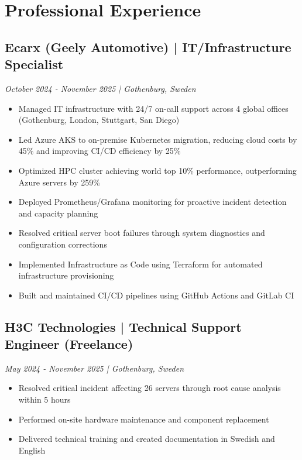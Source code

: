 \documentclass[11pt,a4paper]{article}
\begin{document}

\section*{Professional Experience}

\subsection*{Ecarx (Geely Automotive) | IT/Infrastructure Specialist}
\textit{October 2024 - November 2025 | Gothenburg, Sweden}

\begin{itemize}[leftmargin=*, itemsep=2pt]
\item Managed IT infrastructure with 24/7 on-call support across 4 global offices (Gothenburg, London, Stuttgart, San Diego)
\item Led Azure AKS to on-premise Kubernetes migration, reducing cloud costs by 45\% and improving CI/CD efficiency by 25\%
\item Optimized HPC cluster achieving world top 10\% performance, outperforming Azure servers by 259\%
\item Deployed Prometheus/Grafana monitoring for proactive incident detection and capacity planning
\item Resolved critical server boot failures through system diagnostics and configuration corrections
\item Implemented Infrastructure as Code using Terraform for automated infrastructure provisioning
\item Built and maintained CI/CD pipelines using GitHub Actions and GitLab CI
\end{itemize}

\subsection*{H3C Technologies | Technical Support Engineer (Freelance)}
\textit{May 2024 - November 2025 | Gothenburg, Sweden}

\begin{itemize}[leftmargin=*, itemsep=2pt]
\item Resolved critical incident affecting 26 servers through root cause analysis within 5 hours
\item Performed on-site hardware maintenance and component replacement
\item Delivered technical training and created documentation in Swedish and English
\end{itemize}
\end{document}
